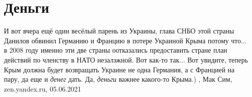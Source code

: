  
 
 
 
 
\chapter{Деньги}
\label{sec:slova.dengi}

И вот вчера ещё один весёлый парень из Украины, глава СНБО этой страны Данилов
обвинил Германию и Францию в потере Украиной Крыма потому что... в 2008 году
именно эти две страны оотказались предоставить стране план действий по членству
в НАТО незалэжной.  Вот как-то так... Вот увидите, теперь Крым должна будет
возвращать Украине не одна Германия, а с Францией на пару, да еще и \emph{денег} дать.
Да, \emph{деньги} важнее какого-то Крыма.)
, 
Мак Сим, zen.yandex.ru, 05.06.2021
